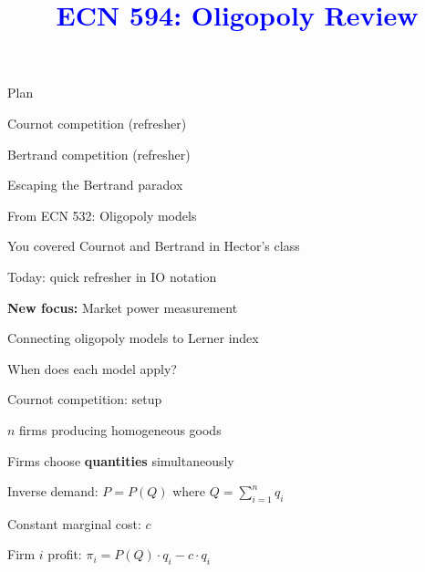 \documentclass[notes,11pt, aspectratio=169]{beamer}
\title[]{\textcolor{blue}{ECN 594: Oligopoly Review}}
\author[PGP]{}
\institute[FRBNY]{\small{\begin{tabular}{c c c}
Nicholas Vreugdenhil \\
\end{tabular}}}
\date{}
\newenvironment{wideitemize}{\itemize\addtolength{\itemsep}{10pt}}{\enditemize}
\newenvironment{wideenumerate}{\enumerate\addtolength{\itemsep}{10pt}}{\endenumerate}
\begin{document}
\begin{frame}
\maketitle
  \centering
\end{frame}


\begin{frame}{Plan}
  \begin{wideenumerate}
    \item Cournot competition (refresher)
    \item Bertrand competition (refresher)
    \item Escaping the Bertrand paradox
  \end{wideenumerate}
\end{frame}


\begin{frame}{From ECN 532: Oligopoly models}
	\begin{wideitemize}
		\item You covered Cournot and Bertrand in Hector's class
		\item Today: quick refresher in IO notation
		\item \textbf{New focus:} Market power measurement
		\begin{wideitemize}
			\vspace{5pt}
			\item Connecting oligopoly models to Lerner index
			\item When does each model apply?
		\end{wideitemize}
	\end{wideitemize}
\end{frame}

\begin{frame}{Cournot competition: setup}
	\begin{wideitemize}
		\item $n$ firms producing homogeneous goods
		\item Firms choose \textbf{quantities} simultaneously
		\item Inverse demand: $P = P(Q)$ where $Q = \sum_{i=1}^n q_i$
		\item Constant marginal cost: $c$
		\item Firm $i$ profit: $\pi_i = P(Q) \cdot q_i - c \cdot q_i$
	\end{wideitemize}
\end{frame}
\end{document}
